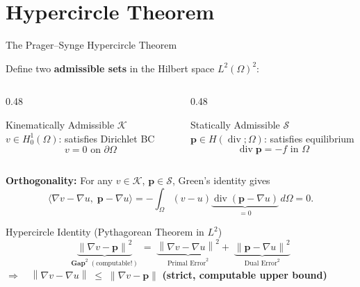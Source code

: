 \documentclass[10pt,aspectratio=169]{beamer}
\DeclareMathOperator{\divg}{div}
\newcommand{\norm}[1]{\left\|#1\right\|}
\begin{document}
\section{Hypercircle Theorem}

\begin{frame}{The Prager--Synge Hypercircle Theorem}

  Define two \textbf{admissible sets} in the Hilbert space $L^2(\Omega)^2$:

  \begin{columns}[T]
    \begin{column}{0.48\textwidth}
      \begin{block}{Kinematically Admissible $\mathcal{K}$}
        $v \in H^1_0(\Omega)$: satisfies Dirichlet BC
        \[
          v = 0 \text{ on } \partial\Omega
        \]
      \end{block}
    \end{column}
    \begin{column}{0.48\textwidth}
      \begin{block}{Statically Admissible $\mathcal{S}$}
        $\mathbf{p} \in H(\divg;\Omega)$: satisfies equilibrium
        \[
          \divg\mathbf{p} = -f \text{ in } \Omega
        \]
      \end{block}
    \end{column}
  \end{columns}
  \bigskip

  \textbf{Orthogonality:} For any $v\!\in\!\mathcal{K}$,
  $\mathbf{p}\!\in\!\mathcal{S}$, Green's identity gives
  \[
    \langle \nabla v - \nabla u,\; \mathbf{p} - \nabla u \rangle
    = -\!\int_\Omega (v-u)\underbrace{\divg(\mathbf{p}-\nabla u)}_{=0}\,d\Omega = 0.
  \]

  \begin{alertblock}{Hypercircle Identity (Pythagorean Theorem in $L^2$)}
    \[
      \underbrace{\norm{\nabla v - \mathbf{p}}^2}_{\textbf{Gap}^2 \;(\text{computable!})}
      \;=\;
      \underbrace{\norm{\nabla v - \nabla u}^2}_{\text{Primal Error}^2}
      +\;
      \underbrace{\norm{\mathbf{p} - \nabla u}^2}_{\text{Dual Error}^2}
    \]
    $\Rightarrow\quad \norm{\nabla v - \nabla u} \;\le\; \norm{\nabla v - \mathbf{p}}$
    \quad \textbf{(strict, computable upper bound)}
  \end{alertblock}
\end{frame}
\end{document}
